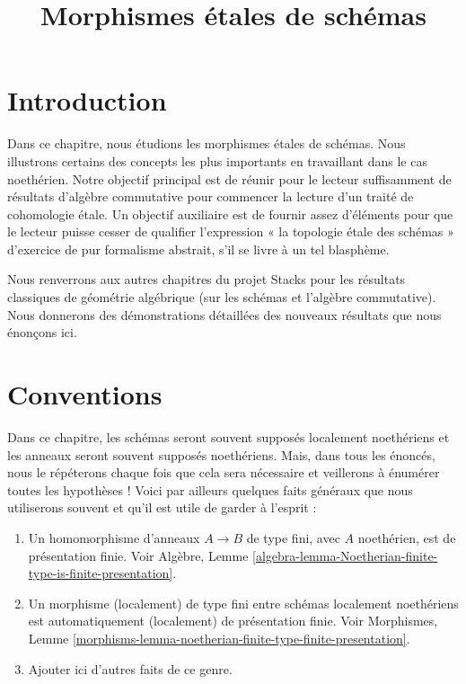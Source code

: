 

%


\title{Morphismes \'etales de schémas}

\maketitle

\label{section-phantom}

\tableofcontents



\section{Introduction}
\label{section-introduction}

\noindent
Dans ce chapitre, nous étudions les morphismes \'etales de schémas. Nous illustrons
certains des concepts les plus importants en travaillant dans le cas noethérien.
Notre objectif principal est de réunir pour le lecteur suffisamment de résultats
d'algèbre commutative pour commencer la lecture d'un traité de cohomologie \'etale. Un
objectif auxiliaire est de fournir assez d'éléments pour que le lecteur puisse
cesser de qualifier l'expression « la topologie \'etale des schémas »
d'exercice de pur formalisme abstrait, s'il se livre à un tel blasphème.

\medskip\noindent
Nous renverrons aux autres
chapitres du projet Stacks pour les résultats classiques de géométrie algébrique
(sur les schémas et l'algèbre commutative). Nous donnerons des démonstrations
détaillées des nouveaux résultats que nous énonçons ici.




\section{Conventions}
\label{section-conventions}

\noindent
Dans ce chapitre, les schémas seront souvent supposés localement noethériens
et les anneaux seront souvent supposés noethériens. Mais, dans tous les énoncés,
nous le répéterons chaque fois que cela sera nécessaire et veillerons à énumérer
toutes les hypothèses ! Voici par ailleurs quelques faits généraux que nous utiliserons
souvent et qu'il est utile de garder à l'esprit :
\begin{enumerate}
\item Un homomorphisme d'anneaux $A \to B$ de type fini, avec $A$ noethérien,
est de présentation finie. Voir Algèbre,
Lemme \ref{algebra-lemma-Noetherian-finite-type-is-finite-presentation}.
\item Un morphisme (localement) de type fini entre schémas localement noethériens
est automatiquement (localement) de présentation finie.
Voir Morphismes,
Lemme \ref{morphisms-lemma-noetherian-finite-type-finite-presentation}.
\item Ajouter ici d'autres faits de ce genre.
\end{enumerate}




